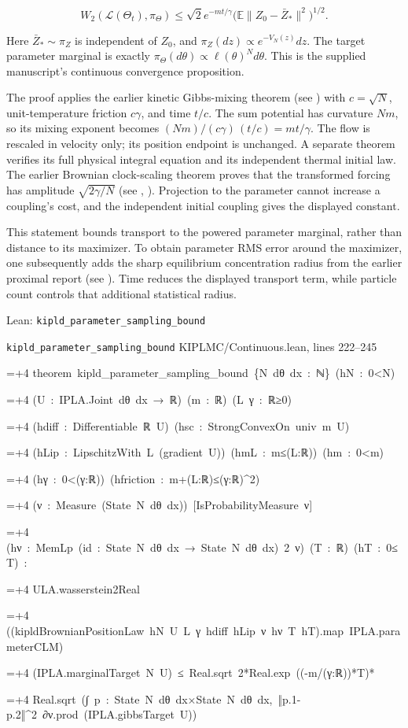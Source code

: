 \documentclass[11pt,a4paper]{report}
\newlength{\leancharwidth}
\newenvironment{leancode}{\par\smallskip\begingroup\ttfamily\footnotesize\raggedright
  \settowidth{\leancharwidth}{M}\setlength{\parskip}{0pt}\setlength{\parindent}{0pt}
  \frenchspacing}{\par\endgroup\smallskip}
\newcommand{\leanline}[2]{\hangindent=\dimexpr#1\leancharwidth+4\leancharwidth\relax
  \hangafter=1\noindent\hspace*{#1\leancharwidth}#2\par}
\newcommand{\leansource}[1]{\par{\footnotesize\color{leanmuted}#1}\par}
\begin{document}
\[\boxed{W_2(\mathcal L(\Theta_t),\pi_\Theta)\le\sqrt2e^{-mt/\gamma}\bigl(\mathbb E\|Z_0-\bar Z_*\|^2\bigr)^{1/2}.}\]


Here \(\bar Z_*\sim\pi_Z\) is independent of \(Z_0\), and \(\pi_Z(dz)\propto e^{-V_N(z)}dz\). The target parameter marginal is exactly \(\pi_\Theta(d\theta)\propto\ell(\theta)^N d\theta\). This is the supplied manuscript’s continuous convergence proposition.




The proof applies the earlier kinetic Gibbs-mixing theorem (see \cite[Section~3.58.4]{LangevinLean2026Kinetic}) with \(c=\sqrt N\), unit-temperature friction \(c\gamma\), and time \(t/c\). The sum potential has curvature \(Nm\), so its mixing exponent becomes \((Nm)/(c\gamma)\,(t/c)=mt/\gamma\). The flow is rescaled in velocity only; its position endpoint is unchanged. A separate theorem verifies its full physical integral equation and its independent thermal initial law. The earlier Brownian clock-scaling theorem proves that the transformed forcing has amplitude \(\sqrt{2\gamma/N}\) (see \cite[Section~3.105.1]{LangevinLean2026Kinetic}, \cite[Section~3.105.2]{LangevinLean2026Kinetic}). Projection to the parameter cannot increase a coupling’s cost, and the independent initial coupling gives the displayed constant.



This statement bounds transport to the powered parameter marginal, rather than distance to its maximizer. To obtain parameter RMS error around the maximizer, one subsequently adds the sharp equilibrium concentration radius from the earlier proximal report (see \cite[Section~3.6.1]{LangevinLean2026Proximal}). Time reduces the displayed transport term, while particle count controls that additional statistical radius.

\begin{leanbox}{Lean: \texttt{kipld\_\allowbreak{}parameter\_\allowbreak{}sampling\_\allowbreak{}bound}}
\leansource{\texttt{kipld\_\allowbreak{}parameter\_\allowbreak{}sampling\_\allowbreak{}bound} \quad KIPLMC/\allowbreak{}Continuous.lean, lines 222–245}
\begin{leancode}
\leanline{0}{theorem\ kipld\_parameter\_sampling\_bound\ \{N\ dθ\ dx\ :\ ℕ\}\ (hN\ :\ 0<N)}
\leanline{4}{(U\ :\ IPLA.Joint\ dθ\ dx\ →\ ℝ)\ (m\ :\ ℝ)\ (L\ γ\ :\ ℝ≥0)}
\leanline{4}{(hdiff\ :\ Differentiable\ ℝ\ U)\ (hsc\ :\ StrongConvexOn\ univ\ m\ U)}
\leanline{4}{(hLip\ :\ LipschitzWith\ L\ (gradient\ U))\ (hmL\ :\ m≤(L:ℝ))\ (hm\ :\ 0<m)}
\leanline{4}{(hγ\ :\ 0<(γ:ℝ))\ (hfriction\ :\ m+(L:ℝ)≤(γ:ℝ)\textasciicircum{}2)}
\leanline{4}{(ν\ :\ Measure\ (State\ N\ dθ\ dx))\ [IsProbabilityMeasure\ ν]}
\leanline{4}{(hν\ :\ MemLp\ (id\ :\ State\ N\ dθ\ dx\ →\ State\ N\ dθ\ dx)\ 2\ ν)\ (T\ :\ ℝ)\ (hT\ :\ 0≤T)\ :}
\leanline{4}{ULA.wasserstein2Real}
\leanline{6}{((kipldBrownianPositionLaw\ hN\ U\ L\ γ\ hdiff\ hLip\ ν\ hν\ T\ hT).map\ IPLA.parameterCLM)}
\leanline{6}{(IPLA.marginalTarget\ N\ U)\ ≤\ Real.sqrt\ 2*Real.exp\ ((-m/(γ:ℝ))*T)*}
\leanline{8}{Real.sqrt\ (∫\ p\ :\ State\ N\ dθ\ dx×State\ N\ dθ\ dx,\ ‖p.1-p.2‖\textasciicircum{}2\ ∂ν.prod\ (IPLA.gibbsTarget\ U))}
\end{leancode}
\end{leanbox}
\end{document}
